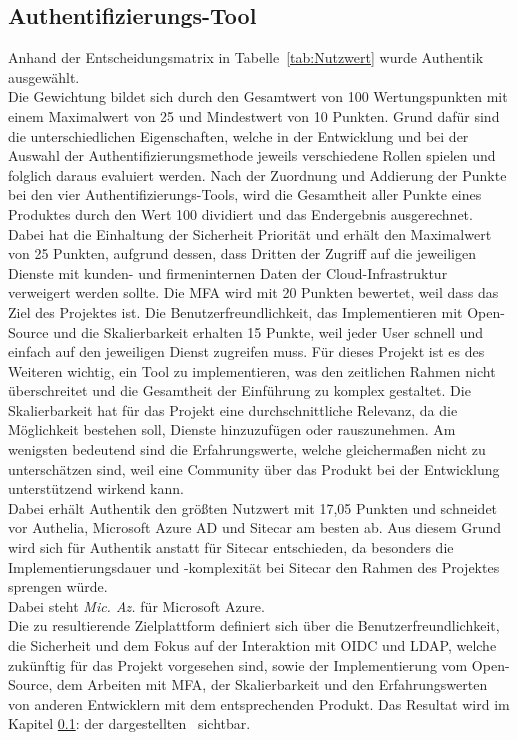 \subsection{Authentifizierungs-Tool}
\label{sec:Authentifizierungs-Tool}
Anhand der Entscheidungsmatrix in Tabelle~\ref{tab:Nutzwert} wurde Authentik ausgewählt. 
\\Die Gewichtung bildet sich durch den Gesamtwert von 100 Wertungspunkten mit einem Maximalwert von 25 und Mindestwert von 10 Punkten. 
Grund dafür sind die unterschiedlichen Eigenschaften, welche in der Entwicklung und bei der Auswahl der 
Authentifizierungsmethode jeweils verschiedene Rollen spielen und folglich daraus evaluiert werden. Nach der Zuordnung 
und Addierung der Punkte bei den vier Authentifizierungs-Tools, wird die Gesamtheit aller Punkte eines Produktes durch den 
Wert 100 dividiert und das Endergebnis ausgerechnet. Dabei hat die Einhaltung der Sicherheit Priorität und erhält den 
Maximalwert von 25 Punkten, aufgrund dessen, dass Dritten der Zugriff auf die jeweiligen Dienste mit kunden- und 
firmeninternen Daten der Cloud-Infrastruktur verweigert werden sollte. Die \acs{MFA} wird mit 20 Punkten bewertet, weil 
dass das Ziel des Projektes ist. Die Benutzerfreundlichkeit, das Implementieren mit Open-Source und die Skalierbarkeit 
erhalten 15 Punkte, weil jeder User schnell und einfach auf den jeweiligen Dienst zugreifen muss. 
Für dieses Projekt ist es des Weiteren wichtig, ein Tool zu implementieren, was den zeitlichen Rahmen nicht überschreitet und die 
Gesamtheit der Einführung zu komplex gestaltet. Die Skalierbarkeit hat für das Projekt eine durchschnittliche Relevanz, da die 
Möglichkeit bestehen soll, Dienste hinzuzufügen oder rauszunehmen. Am wenigsten bedeutend sind die Erfahrungswerte, welche 
gleichermaßen nicht zu unterschätzen sind, weil eine Community über das Produkt bei der Entwicklung unterstützend wirkend kann.
\\Dabei erhält Authentik den größten Nutzwert mit 17,05 Punkten und schneidet vor Authelia, Microsoft Azure AD und Sitecar am besten ab. 
Aus diesem Grund wird sich für Authentik anstatt für Sitecar entschieden, da besonders die Implementierungsdauer und -komplexität 
bei Sitecar den Rahmen des Projektes sprengen würde.
\\Dabei steht \textit{Mic. Az.} für Microsoft Azure.
\\Die zu resultierende Zielplattform definiert sich über die Benutzerfreundlichkeit, die Sicherheit und dem Fokus auf der Interaktion 
mit \acs{OIDC} und \acs{LDAP}, welche zukünftig für das Projekt vorgesehen sind, sowie der Implementierung vom Open-Source, dem Arbeiten mit MFA, 
der Skalierbarkeit und den Erfahrungswerten von anderen Entwicklern mit dem entsprechenden Produkt. Das Resultat wird im Kapitel 
\ref{sec:Authentifizierungs-Tool}:  der dargestellten~ sichtbar.

